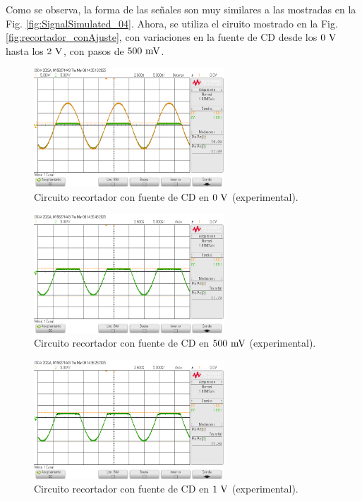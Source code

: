 \documentclass[journal]{IEEEtran}
\begin{document}
Como se observa, la forma de las señales son muy similares a las mostradas en la Fig. \ref{fig:SignalSimulated_04}. Ahora, se utiliza el ciruito mostrado en la Fig. \ref{fig:recortador_conAjuste}, 
con variaciones en la fuente de CD desde los $0~\textnormal{V}$ hasta los $2~\textnormal{V}$, con pasos de $500~\textnormal{mV}$.

\begin{figure}[H]
        \centering
        \includegraphics[width=2.8in]{SignalExperimental_06.png}
        \caption{Circuito recortador con fuente de CD en $0~\textnormal{V}$ (experimental).}
        \label{fig:SignalExperimental_06}
\end{figure}
\begin{figure}[H]
        \centering
        \includegraphics[width=2.8in]{SignalExperimental_07.png}
        \caption{Circuito recortador con fuente de CD en $500~\textnormal{mV}$ (experimental).}
        \label{fig:SignalExperimental_07}
\end{figure}
\begin{figure}[H]
        \centering
        \includegraphics[width=2.8in]{SignalExperimental_08.png}
        \caption{Circuito recortador con fuente de CD en $1~\textnormal{V}$ (experimental).}
        \label{fig:SignalExperimental_08}
\end{figure}
\end{document}
